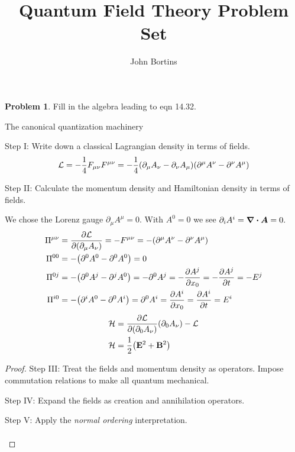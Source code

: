 \documentclass[letterpaper]{article}
\title{Quantum Field Theory Problem Set}
\author{John Bortins}
\theoremstyle{definition}
\newtheorem{prob}{Problem}[section]
\begin{document}
\maketitle{}


\begin{prob}
  Fill in the algebra leading to eqn 14.32.
\end{prob}
The canonical quantization machinery

Step I: Write down a classical Lagrangian density in terms of fields.\[\mathcal{L}=-\frac{1}{4}F_{\mu\nu}F^{\mu\nu}=-\frac{1}{4}\pqty{\partial_\mu A_\nu-\partial_\nu A_\mu}\pqty{\partial^\mu A^\nu-\partial^\nu A^\mu}\]

Step II: Calculate the momentum density and Hamiltonian density in terms of fields.

We chose the Lorenz gauge \(\partial_\mu A^\mu=0.\) With \(A^0=0\) we see \(\partial_i A^i=\div \vb*{A}=0.\)
\begin{align*}
  \Pi^{\mu\nu} & =\pdv{\mathcal{L}}{(\partial_\mu A_\nu)}=-F^{\mu\nu}=-\pqty{\partial^\mu A^\nu-\partial^\nu A^\mu} \\
  \Pi^{00}     & =-\pqty{\partial^0 A^0-\partial^0 A^0}=0                                                           \\
  \Pi^{0j}     & =-\pqty{\partial^0 A^j-\partial^j A^0}=-\partial^0 A^j=-\pdv{A^j}{x_0}=-\pdv{A^j}{t}=-E^j          \\
  \Pi^{i0}     & =-\pqty{\partial^i A^0-\partial^0 A^i}= \partial^0 A^i=\pdv{A^i}{x_0}=\pdv{A^i}{t}=E^i             \\
\end{align*}
\begin{align*}
  \mathcal{H} & ={\pdv{\mathcal{L}}{(\partial_0 A_\nu)}}   (\partial_0 A_\nu)-\mathcal{L} \\
  \mathcal{H} & =\frac{1}{2}\pqty{\vb{E}^2+\vb{B}^2}                                      \\
\end{align*}

\begin{proof}

  Step III: Treat the fields and momentum density as operators. Impose commutation relations to make all quantum mechanical.

  Step IV: Expand the fields as creation and annihilation operators.

  Step V: Apply the \emph{normal ordering} interpretation.

  \begin{align*}
  \end{align*}

\end{proof}
\end{document}
